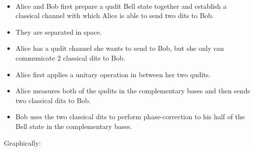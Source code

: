 \begin{protocol} \
\label{proto:tele}
\allowdisplaybreaks
\begin{itemize}

\item
Alice and Bob first prepare a qudit Bell state together and establish a classical channel with which Alice is able to send two dits to Bob.

\item
They are separated in space. 

\item
Alice has a qudit channel she wants to send to Bob, but she only can communicate 2 classical dits to Bob. 

\item
Alice first applies a unitary operation in between her two qudits. 


\item
Alice  measures both of the qudits in the complementary bases and then sends two classical dits to Bob. 

\item
 Bob uses the two classical dits to perform phase-correction to his half of the Bell state in the complementary bases.

\end{itemize}

Graphically:


\end{protocol}
